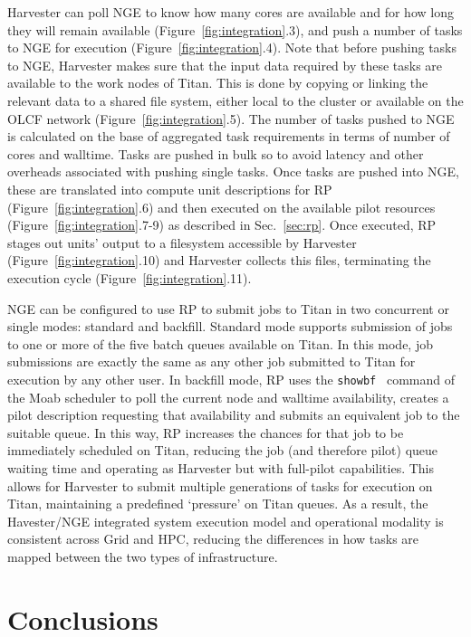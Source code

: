 \documentclass{webofc}
\begin{document}
Harvester can poll NGE to know how many cores are available and for how long
they will remain available (Figure~\ref{fig:integration}.3), and push a
number of tasks to NGE for execution (Figure~\ref{fig:integration}.4). Note
that before pushing tasks to NGE, Harvester makes sure that the input data
required by these tasks are available to the work nodes of Titan. This is
done by copying or linking the relevant data to a shared file system, either
local to the cluster or available on the OLCF network
(Figure~\ref{fig:integration}.5). The number of tasks pushed to NGE is
calculated on the base of aggregated task requirements in terms of number of
cores and walltime. Tasks are pushed in bulk so to avoid latency and other
overheads associated with pushing single tasks. Once tasks are pushed into
NGE, these are translated into compute unit descriptions for RP
(Figure~\ref{fig:integration}.6) and then executed on the available pilot
resources (Figure~\ref{fig:integration}.7-9) as described in
Sec.~\ref{sec:rp}. Once executed, RP stages out units' output to a filesystem
accessible by Harvester (Figure~\ref{fig:integration}.10) and Harvester
collects this files, terminating the execution cycle
(Figure~\ref{fig:integration}.11).

NGE can be configured to use RP to submit jobs to Titan in two concurrent or
single modes: standard and backfill. Standard mode supports submission of
jobs to one or more of the five batch queues available on Titan. In this
mode, job submissions are exactly the same as any other job submitted to
Titan for execution by any other user. In backfill mode, RP uses the
\texttt{showbf}~\cite{showbf} command of the Moab scheduler to poll the
current node and walltime availability, creates a pilot description
requesting that availability and submits an equivalent job to the suitable
queue. In this way, RP increases the chances for that job to be immediately
scheduled on Titan, reducing the job (and therefore pilot) queue waiting time
and operating as Harvester but with full-pilot capabilities. This allows for
Harvester to submit multiple generations of tasks for execution on Titan,
maintaining a predefined ‘pressure’ on Titan queues. As a result, the
Havester/NGE integrated system execution model and operational modality is
consistent across Grid and HPC, reducing the differences in how tasks are
mapped between the two types of infrastructure.


\section{Conclusions}
\end{document}
